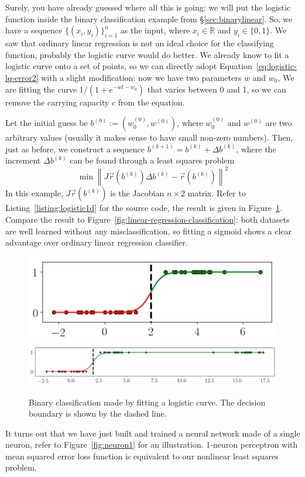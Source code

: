 \documentclass[notitlepage,oneside]{book}
\begin{document}
Surely, you have already guessed where all this is going: we will put the logistic function inside the binary classification example from \S\ref{sec:binarylinear}.
So, we have a sequence $\{(x_i, y_i)\}_{i=1}^n$ as the input, where $x_i\in\mathbb R$ and $y_i\in \{0,1\}$.
We saw that ordinary linear regression is not an ideal choice for the classifying function,
probably the logistic curve would do better.
We already know to fit a logistic curve onto a set of points,
so we can directly adopt Equation~\eqref{eq:logistic-lq-error2} with a slight modification: now we have two parameters $w$ and $w_0$,
We are fitting the curve $1/(1+e^{-wt - w_0})$ that varies between 0 and 1, so we can remove the carrying capacity $c$ from the equation.

Let the initial guess be $b^{(0)} := \left(w_0^{(0)}, w^{(0)}\right)$, where $w_0^{(0)}$ and $w^{(0)}$ are two arbitrary values (usually it makes sense to have small non-zero numbers).
Then, just as before, we construct a sequence $b^{(k+1)} = b^{(k)} + \Delta b^{(k)}$,
where the increment $\Delta b^{(k)}$ can be found through a least squares problem
$$
\min \left\| J\vec{r}\left(b^{(k)}\right) \Delta b^{(k)} - \vec{r}\left(b^{(k)}\right) \right\|^2
$$
In this example, $J\vec{r}\left(b^{(k)}\right)$ is the Jacobian $n\times 2$ matrix.
Refer to Listing~\ref{listing:logistic1d} for the source code, the result is given in Figure~\ref{fig:logistic-vs-linear}.
Compare the result to Figure~\ref{fig:linear-regression-classification}: both datasets are well learned without any misclassification,
so fitting a sigmoid shows a clear advantage over ordinary linear regression classifier.

\begin{figure}[htb]
    \centering
    \includegraphics[width=.305\linewidth]{img/logistic-1d-a.png}
    \includegraphics[width=.64\linewidth]{img/logistic-1d-b.png}
    \caption{Binary classification made by fitting a logistic curve. The decision boundary is shown by the dashed line.}
    \label{fig:logistic-vs-linear}
\end{figure}

It turns out that we have just built and trained a neural network made of a single neuron, refer to Figure~\ref{fig:neuron1} for an illustration.
1-neuron perceptron with mean squared error loss function is equivalent to our nonlinear least squares problem.
\end{document}
